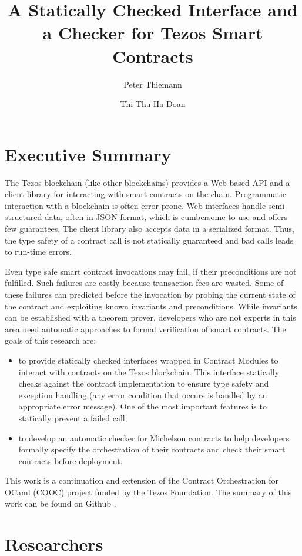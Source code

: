 \documentclass[a4paper,11pt]{article}
\title{A Statically Checked Interface and a Checker for Tezos Smart Contracts}
\author{Peter Thiemann}
\author{Thi Thu Ha Doan}
\affil{University of Freiburg, Germany}
\begin{document}
\maketitle{}

\section{Executive Summary}
\label{sec:executive-summary}
The Tezos blockchain (like other blockchains) provides a Web-based API and a client library for interacting with smart contracts on the chain. Programmatic interaction with a blockchain is often error prone. Web interfaces handle semi-structured data, often in JSON format, which is cumbersome to use and offers few guarantees. The client library also accepts data in a serialized format. Thus, the type safety of a contract call is not statically guaranteed and bad calls leads to run-time errors.

Even type safe smart contract invocations may fail, if their preconditions are not fulfilled. Such failures are costly because transaction fees are wasted.  Some of these failures can predicted before the invocation by probing the current state of the contract and exploiting known invariants and preconditions. While invariants can be established with a theorem prover, developers who are not experts in this area need automatic approaches to formal verification of  smart contracts. The goals of this research are:

\begin{itemize}
\item to provide statically checked interfaces wrapped in Contract Modules to interact with contracts on the Tezos blockchain. This interface statically checks against the contract implementation to ensure type safety and exception handling (any error condition that occurs is handled by an appropriate error message). One of the most important features is to statically prevent a failed call; 
\item to develop an automatic checker for Michelson contracts to help developers formally specify the orchestration of their contracts and check their smart contracts before deployment.
\end{itemize}

This work is a continuation and extension of the Contract Orchestration for OCaml (COOC) project funded by the Tezos Foundation. The summary of this work can be found on Github \cite{tezos-report}.

\section{Researchers}
\label{sec:researchers}
\end{document}
